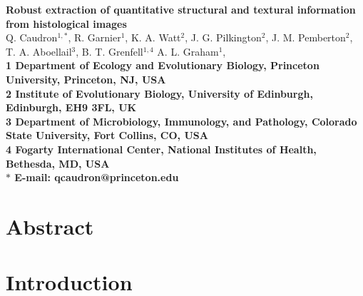 \documentclass[10pt]{article}
\date{}
\begin{document}
\begin{flushleft}
{\Large
\textbf{Robust extraction of quantitative structural and textural information from histological images}
}
\\
Q. Caudron$^{1,\ast}$, 
R. Garnier$^{1}$, 
K. A. Watt$^{2}$, 
J. G. Pilkington$^{2}$,
J. M. Pemberton$^{2}$,
T. A. Aboellail$^3$,
B. T. Grenfell$^{1,4}$
A. L. Graham$^1$,
\\
\bf{1} Department of Ecology and Evolutionary Biology, Princeton University, Princeton, NJ, USA
\\

\bf{2} Institute of Evolutionary Biology, University of Edinburgh, Edinburgh, EH9 3FL, UK
\\

\bf{3} Department of Microbiology, Immunology, and Pathology, Colorado State University, Fort Collins, CO, USA
\\	
\bf{4} Fogarty International Center, National Institutes of Health, Bethesda, MD, USA
\\
$\ast$ E-mail: qcaudron@princeton.edu
\end{flushleft}













\section*{Abstract}















\section*{Introduction}
\end{document}
